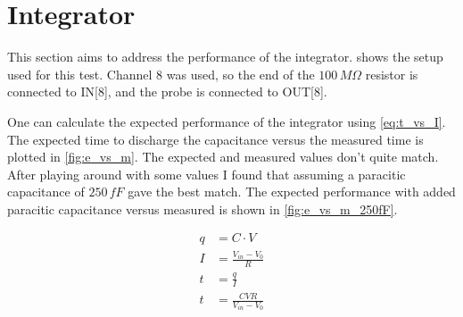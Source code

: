 \documentclass{article}
\begin{document}



\section{Integrator}
This section aims to address the performance of the integrator.  shows the setup used for this test. Channel 8 was used, so the end of the $100\,M\Omega$ resistor is connected to IN[8], and the probe is connected to OUT[8]. 



One can calculate the expected performance of the integrator using \cref{eq:t_vs_I}. The expected time to discharge the capacitance versus the measured time is plotted in \cref{fig:e_vs_m}. The expected and measured values don't quite match. After playing around with some values I found that assuming a paracitic capacitance of $250\,fF$ gave the best match. The expected performance with added paracitic capacitance versus measured is shown in \cref{fig:e_vs_m_250fF}.

\begin{align}
	q&=C\cdot V\\
	I&=\frac{V_{in}-V_0}{R}\\
	t&=\frac{q}{I}\\
	t&=\frac{CVR}{V_{in}-V_0}\label{eq:t_vs_I}
\end{align}
\end{document}
